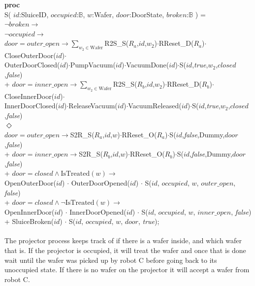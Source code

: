 \documentclass[12pt]{report}
\begin{document}
	{\small
	\textbf{proc}\\
	\phantom{---} S( $id$:SluiceID, $occupied$:$\mathbb{B}$, $w$:Wafer, $door$:DoorState, $broken$:$\mathbb{B}$ ) =\\
	\phantom{------} $\neg broken \rightarrow$\\
	\phantom{---------} $\neg occupied \rightarrow$\\
	\phantom{-------------} $door=outer\_open \rightarrow\sum\nolimits_{w_2\in \text{Wafer}}$R2S\_S($R_a$,$id$,$w_2$)$\cdot$RReset\_D($R_a$)$\cdot$CloseOuterDoor($id$)$\cdot$\\
	\phantom{-----------------} OuterDoorClosed($id$)$\cdot$PumpVacuum($id$)$\cdot$VacuumDone($id$)$\cdot$S($id$,\emph{true},$w_2$,$closed$,\emph{false})\\
	\phantom{-------------} + $door=inner\_open \rightarrow\sum\nolimits_{w_2\in \text{Wafer}}$R2S\_S($R_b$,$id$,$w_2$)$\cdot$RReset\_D($R_b$)$\cdot$CloseInnerDoor($id$)$\cdot$\\
	\phantom{-----------------} InnerDoorClosed($id$)$\cdot$ReleaseVacuum($id$)$\cdot$VacuumReleased($id$)$\cdot$S($id$,\emph{true},$w_2$,$closed$,\emph{false})\\
	\phantom{---------} $\Diamond$\\
	\phantom{-------------} $door=outer\_open \rightarrow$S2R\_S($R_a$,$id$,$w$)$\cdot$RReset\_O($R_a$)$\cdot$S($id$,\emph{false},Dummy,$door$,\emph{false})\\
	\phantom{-------------} + $door=inner\_open \rightarrow$S2R\_S($R_b$,$id$,$w$)$\cdot$RReset\_O($R_b$)$\cdot$S($id$,\emph{false},Dummy,$door$,\emph{false})\\
	\phantom{---------} + $door=closed \land \text{IsTreated}(w) \rightarrow$\\
	\phantom{-------------} OpenOuterDoor($id$) $\cdot$ OuterDoorOpened($id$) $\cdot$ S($id$, $occupied$, $w$, $outer\_open$, \emph{false})\\
	\phantom{---------} + $door=closed \land \neg\text{IsTreated}(w) \rightarrow$\\
	\phantom{-------------} OpenInnerDoor($id$) $\cdot$ InnerDoorOpened($id$) $\cdot$ S($id$, $occupied$, $w$, $inner\_open$, \emph{false})\\
	\phantom{---------} + SluiceBroken($id$) $\cdot$ S($id$, $occupied$, $w$, $door$, \emph{true});\\
	}\\
	The projector process keeps track of if there is a wafer inside, and which wafer that is. If the projector is occupied, it will treat the wafer and once that is done wait until the wafer was picked up by robot C before going back to its unoccupied state. If there is no wafer on the projector it will accept a wafer from robot C.\\
\end{document}
